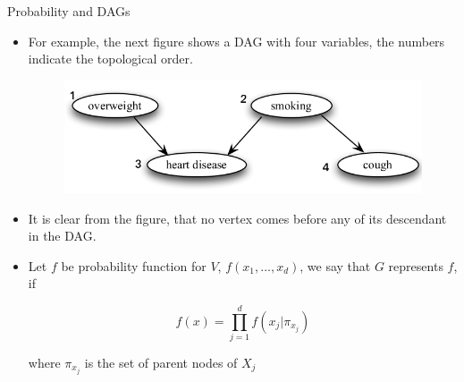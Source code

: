 \documentclass[handout]{beamer}
\begin{document}
\begin{frame}{Probability and DAGs}
\scriptsize{
\begin{itemize}




\item For example, the next figure shows a DAG with four variables, the numbers indicate the topological order.

\begin{figure}[h!]
	\centering
	\includegraphics[scale=0.4]{pics/dag3.png}
	\end{figure} 

\item It is clear from the figure, that no vertex comes before any of its descendant in the DAG.	

\item Let $f$ be probability function  for $V$, $f(x_1,\dots,x_d)$,  we say that $G$ represents $f$, if

\begin{equation}
 f(x) = \prod_{j=1}^d f(x_j| \pi_{x_j}) 
\end{equation}



where $\pi_{x_j}$ is the set of parent nodes of $X_j$	
	


\end{itemize}



} 

\end{frame}
\end{document}
